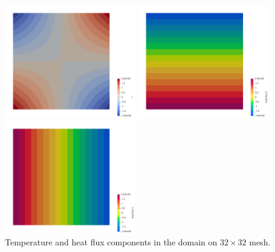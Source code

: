 \begin{center}
\includegraphics[width=5.7cm]{python_codes/fieldstone_173/results/exp4/T}
\includegraphics[width=5.7cm]{python_codes/fieldstone_173/results/exp4/qx}
\includegraphics[width=5.7cm]{python_codes/fieldstone_173/results/exp4/qy}\\
{\captionfont Temperature and heat flux components in the domain on $32 \times 32$ mesh.}
\end{center}

